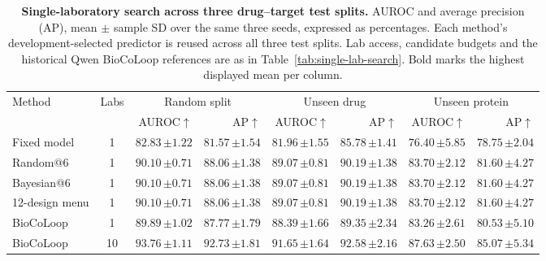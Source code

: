 \begin{table}[!ht]
\centering
\caption{\textbf{Single-laboratory search across three drug--target test splits.} AUROC and average precision (AP), mean $\pm$ sample SD over the same three seeds, expressed as percentages. Each method's development-selected predictor is reused across all three test splits. Lab access, candidate budgets and the historical Qwen BioCoLoop references are as in Table~\ref{tab:single-lab-search}. Bold marks the highest displayed mean per column.}
\label{tab:single-lab-dti-endpoints}
\small
\setlength{\tabcolsep}{3pt}
\renewcommand{\arraystretch}{1.13}
\begin{tabular*}{\textwidth}{@{\extracolsep{\fill}}lcrrrrrr@{}}
\toprule
Method & Labs & \multicolumn{2}{c}{Random split} & \multicolumn{2}{c}{Unseen drug} & \multicolumn{2}{c}{Unseen protein} \\
\cmidrule(lr){3-4}\cmidrule(lr){5-6}\cmidrule(lr){7-8}
 & & AUROC$\uparrow$ & AP$\uparrow$ & AUROC$\uparrow$ & AP$\uparrow$ & AUROC$\uparrow$ & AP$\uparrow$ \\
\midrule
Fixed model & 1 & $82.83\,{\scriptstyle\pm1.22}$ & $81.57\,{\scriptstyle\pm1.54}$ & $81.96\,{\scriptstyle\pm1.55}$ & $85.78\,{\scriptstyle\pm1.41}$ & $76.40\,{\scriptstyle\pm5.85}$ & $78.75\,{\scriptstyle\pm2.04}$ \\
Random@6 & 1 & $90.10\,{\scriptstyle\pm0.71}$ & $88.06\,{\scriptstyle\pm1.38}$ & $89.07\,{\scriptstyle\pm0.81}$ & $90.19\,{\scriptstyle\pm1.38}$ & $83.70\,{\scriptstyle\pm2.12}$ & $81.60\,{\scriptstyle\pm4.27}$ \\
Bayesian@6 & 1 & $90.10\,{\scriptstyle\pm0.71}$ & $88.06\,{\scriptstyle\pm1.38}$ & $89.07\,{\scriptstyle\pm0.81}$ & $90.19\,{\scriptstyle\pm1.38}$ & $83.70\,{\scriptstyle\pm2.12}$ & $81.60\,{\scriptstyle\pm4.27}$ \\
12-design menu & 1 & $90.10\,{\scriptstyle\pm0.71}$ & $88.06\,{\scriptstyle\pm1.38}$ & $89.07\,{\scriptstyle\pm0.81}$ & $90.19\,{\scriptstyle\pm1.38}$ & $83.70\,{\scriptstyle\pm2.12}$ & $81.60\,{\scriptstyle\pm4.27}$ \\
\midrule
BioCoLoop & 1 & $89.89\,{\scriptstyle\pm1.02}$ & $87.77\,{\scriptstyle\pm1.79}$ & $88.39\,{\scriptstyle\pm1.66}$ & $89.35\,{\scriptstyle\pm2.34}$ & $83.26\,{\scriptstyle\pm2.61}$ & $80.53\,{\scriptstyle\pm5.10}$ \\
BioCoLoop & 10 & $\mathbf{93.76}\,{\scriptstyle\pm1.11}$ & $\mathbf{92.73}\,{\scriptstyle\pm1.81}$ & $\mathbf{91.65}\,{\scriptstyle\pm1.64}$ & $\mathbf{92.58}\,{\scriptstyle\pm2.16}$ & $\mathbf{87.63}\,{\scriptstyle\pm2.50}$ & $\mathbf{85.07}\,{\scriptstyle\pm5.34}$ \\
\bottomrule
\end{tabular*}
\end{table}
